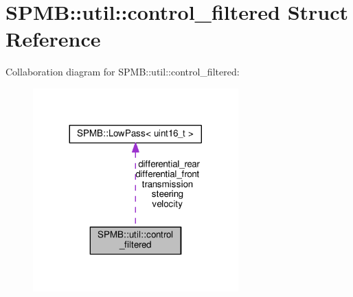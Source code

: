 \hypertarget{structSPMB_1_1util_1_1control__filtered}{}\section{S\+P\+MB\+:\+:util\+:\+:control\+\_\+filtered Struct Reference}
\label{structSPMB_1_1util_1_1control__filtered}


Collaboration diagram for S\+P\+MB\+:\+:util\+:\+:control\+\_\+filtered\+:
\nopagebreak
\begin{figure}[H]
\begin{center}
\leavevmode
\includegraphics[width=224pt]{structSPMB_1_1util_1_1control__filtered__coll__graph}
\end{center}
\end{figure}
